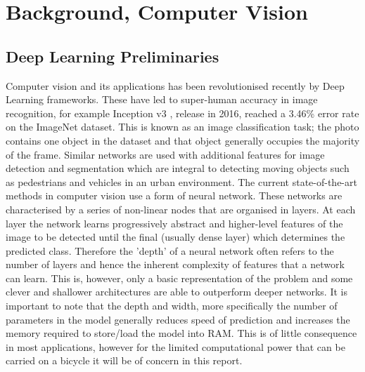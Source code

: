 \documentclass[11pt,twoside]{report}
\begin{document}
\section{Background, Computer Vision}\label{comp_vis_back}
\subsection{Deep Learning Preliminaries} \label{dlp}
Computer vision and its applications has been revolutionised recently by Deep Learning frameworks. These have led to super-human accuracy in image recognition, for example Inception v3 \cite{Szegedy_2016_CVPR}, release in 2016, reached a 3.46\% error rate on the ImageNet \cite{ILSVRC15} dataset. This is known as an image classification task; the photo contains one object in the dataset and that object generally occupies the majority of the frame. Similar networks are used with additional features for image detection and segmentation which are integral to detecting moving objects such as pedestrians and vehicles in an urban environment.
\newline\newline
The current state-of-the-art methods in computer vision use a form of neural network. These networks are characterised by a series of non-linear nodes that are organised in layers. At each layer the network learns progressively abstract and higher-level features of the image to be detected until the final (usually dense layer) which determines the predicted class. Therefore the 'depth' of a neural network often refers to the number of layers and hence the inherent complexity of features that a network can learn. This is, however, only a basic representation of the problem and some clever and shallower architectures are able to outperform deeper networks. It is important to note that the depth and width, more specifically the number of parameters in the model generally reduces speed of prediction and increases the memory required to store/load the model into RAM. This is of little consequence in most applications, however for the limited computational power that can be carried on a bicycle it will be of concern in this report.
\end{document}
